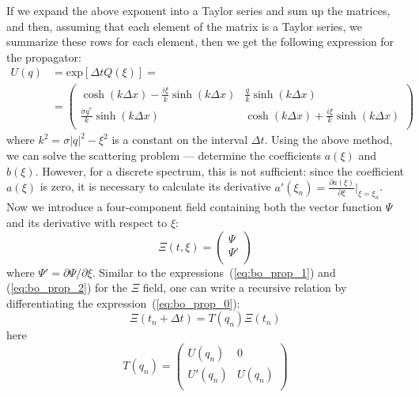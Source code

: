 If we expand the above exponent into a Taylor series and sum up the matrices, and then, assuming that each element of the matrix is a Taylor series, we summarize these rows for each element, then we get the following expression for the propagator:
\begin{equation}
    \begin{aligned}
        U(q) & = \mathrm{exp}[\Delta t Q(\xi)] = \\
        & =
        \begin{pmatrix}
            \cosh(k \Delta x) - \frac{i \xi}{k}\sinh(k \Delta x) & \frac{q}{k}\sinh(k \Delta x) \\
            \frac{\sigma q^{*}}{k}\sinh(k \Delta x) & \cosh(k \Delta x) + \frac{i \xi}{k}\sinh(k \Delta x) \\
        \end{pmatrix}
    \end{aligned}
    \label{eq:bo_prop_2}
\end{equation}
where $ k^2 = \sigma | q |^2 - \xi^2 $ is a constant on the interval $ \Delta t $. Using the above method, we can solve the scattering problem --- determine the coefficients $ a (\xi) $ and $ b (\xi) $. However, for a discrete spectrum, this is not sufficient: since the coefficient $ a (\xi) $ is zero, it is necessary to calculate its derivative $ a'(\xi_n) = \frac{\partial a (\xi)} {\partial \xi} |_{\xi = \xi_n} $. Now we introduce a four-component field containing both the vector function $ \Psi $ and its derivative with respect to $ \xi $:
\begin{equation}
    \Xi(t, \xi) = 
    \begin{pmatrix}
        \Psi \\
        \Psi' \\
    \end{pmatrix}
\end{equation}
where $\Psi' = \partial \Psi / \partial \xi$. 
Similar to the expressions~(\ref{eq:bo_prop_1}) and (\ref{eq:bo_prop_2}) for the $ \Xi $ field, one can write a recursive relation by differentiating the expression~(\ref{eq:bo_prop_0}):
\begin{equation}
    \Xi(t_n + \Delta t) = T(q_n) \Xi(t_n)
\end{equation}
here 
\begin{equation}
    T(q_n) = 
    \begin{pmatrix}
        U(q_n) & 0 \\
        U'(q_n) & U(q_n) \\
    \end{pmatrix}
\end{equation}
